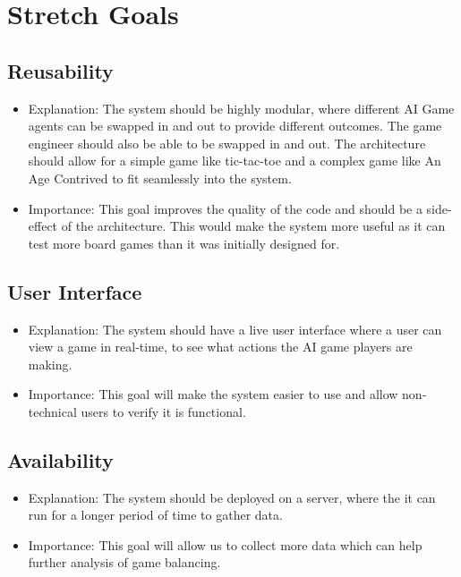 \documentclass{article}
\begin{document}
\section{Stretch Goals}
\subsection{Reusability}
\begin{itemize}
\item Explanation: The system should be highly modular, where different AI Game agents can be swapped in and out to provide different outcomes. The game engineer should also be able
to be swapped in and out. The architecture should allow for a simple game like tic-tac-toe and a complex game like An Age Contrived to fit seamlessly into the system.
\item Importance: This goal improves the quality of the code and should be a side-effect of the architecture. This would make the system more useful as it can test more board games than it was initially designed for.
\end{itemize}

\subsection{User Interface}
\begin{itemize}
\item Explanation: The system should have a live user interface where a user can view a game in real-time, to see what actions the AI game players are making.
\item Importance: This goal will make the system easier to use and allow non-technical users to verify it is functional.
\end{itemize}

\subsection{Availability}
\begin{itemize}
  \item Explanation: The system should be deployed on a server, where the it can run for a longer period of time to gather data.
  \item Importance: This goal will allow us to collect more data which can help further analysis of game balancing.
\end{itemize}
\end{document}
